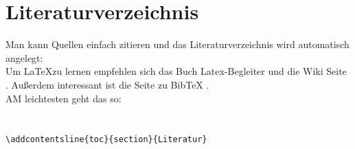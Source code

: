 \documentclass[titlepage, 11pt, a4paper,ngerman]{article}
\begin{document}
\section{Literaturverzeichnis}

Man kann Quellen einfach zitieren und das Literaturverzeichnis wird automatisch angelegt:\\[10pt]
Um \LaTeX zu lernen empfehlen sich das Buch Latex-Begleiter \cite{LatexBegleiter} und die Wiki Seite \cite{LatexWiki}. Außerdem interessant ist die Seite zu BibTeX \cite{BibtexWiki}.\\[10pt]
AM leichtesten geht das so:\\[10pt]
\verb||\\
\verb||\\
\verb|\addcontentsline{toc}{section}{Literatur}|\\[10pt]



\end{document}

